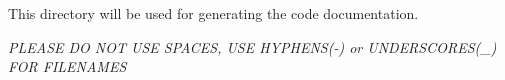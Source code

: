 This directory will be used for generating the code documentation.

{\itshape P\+L\+E\+A\+SE DO N\+OT U\+SE S\+P\+A\+C\+ES, U\+SE H\+Y\+P\+H\+E\+NS(-\/) or U\+N\+D\+E\+R\+S\+C\+O\+R\+E\+S(\+\_\+) F\+OR F\+I\+L\+E\+N\+A\+M\+ES} 